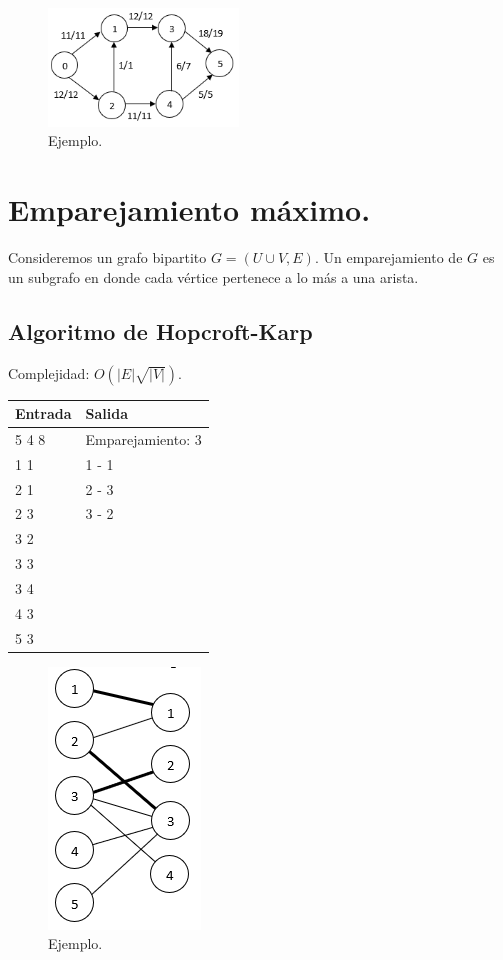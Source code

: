 \documentclass[12pt, letterpaper, twoside]{article}
\begin{document}
\begin{figure}[h]
\centering
\includegraphics[width = 0.45\textwidth]{MaxFlow.png}

\caption{Ejemplo.}
\end{figure}

\newpage

\section{Emparejamiento máximo.}

Consideremos un grafo bipartito $G = (U \cup V, E)$. Un emparejamiento de $G$ es un subgrafo en donde cada vértice pertenece a lo más a una arista.

\subsection{Algoritmo de Hopcroft-Karp}

Complejidad: $O(|E|\sqrt{|V|})$.

 \medskip

\begin{tabular}{|p{7cm}|p{7cm}|}
\hline
\textbf{Entrada} & \textbf{Salida}\\ \hline
5 4 8 & Emparejamiento: 3\\
1 1   & 1 - 1\\
2 1   & 2 - 3\\
2 3   & 3 - 2\\
3 2   & \\
3 3   & \\
3 4   & \\
4 3   & \\
5 3   & \\ \hline
\end{tabular}

\begin{figure}[ht]
\centering
\includegraphics[height = 0.3\textheight]{MaxMatching.png}	

\caption{Ejemplo.}
\end{figure}

\newpage
\end{document}
